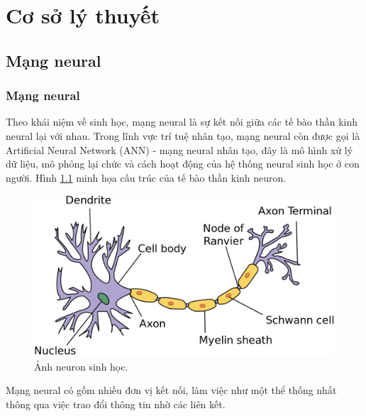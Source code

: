 \chapter{Cơ sở lý thuyết}

\section{Mạng neural}

\subsection{Mạng neural}
	
	
	Theo khái niệm về sinh học, mạng neural là sự kết nối giữa các tế bào thần kinh neural lại với nhau. Trong lĩnh vực trí tuệ nhân tạo, mạng neural còn được gọi là Artificial Neural Network (ANN) - mạng neural nhân tạo, đây là mô hình xử lý dữ liệu, mô phỏng lại chức và cách hoạt động của hệ thống neural sinh học ở con người. Hình \ref{fig:neuron} minh họa cấu trúc của tế bào thần kinh neuron.
	
	\begin{figure}[h!]
		\centering
		\includegraphics[scale=0.18]{charts/neuron.png}
		\caption{Ảnh neuron sinh học.\cite{img-neuron}}
		\label{fig:neuron}
	\end{figure}
	Mạng neural có gồm nhiều đơn vị kết nối, làm việc như một thể thống nhất thông qua việc trao đổi thông tin nhờ các liên kết.
	
